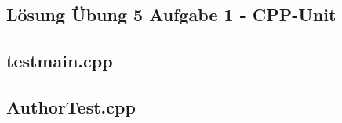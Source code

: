 %
%
%
%

\setcounter{section}{5}
\setcounter{subsection}{1}
%
%
\newpage
\subsection{Lösung Übung 5 Aufgabe 1 - CPP-Unit}

\subsection{testmain.cpp}

\subsection{AuthorTest.cpp}

